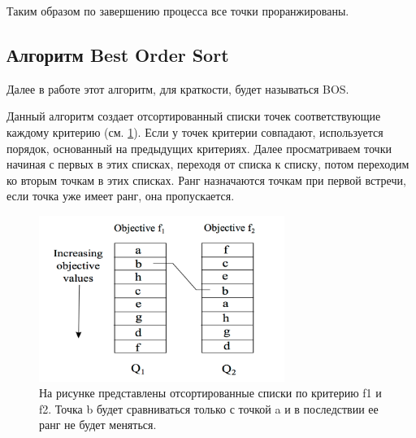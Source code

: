 Таким образом по завершению процесса все точки проранжированы.   


\subsection{Алгоритм Best Order Sort}
Далее в работе этот алгоритм, для краткости, будет называться BOS.

Данный алгоритм создает отсортированный списки точек соответствующие каждому критерию (см. \ref{bos_descr}). Если у точек критерии совпадают, используется порядок, основанный на предыдущих критериях. Далее просматриваем точки начиная с первых в этих списках, переходя от списка к списку, потом переходим ко вторым точкам в этих списках. Ранг назначаются точкам при первой встречи, если точка уже имеет ранг, она пропускается. 

\begin{figure}
\begin{center}
\includegraphics[width=8cm]{pic/bos_pic}
\caption{На рисунке представлены отсортированные списки по критерию f1 и f2. Точка b будет сравниваться только с точкой a и в последствии ее ранг не будет меняться.}
\label{bos_descr}
\end{center}
\end{figure}

